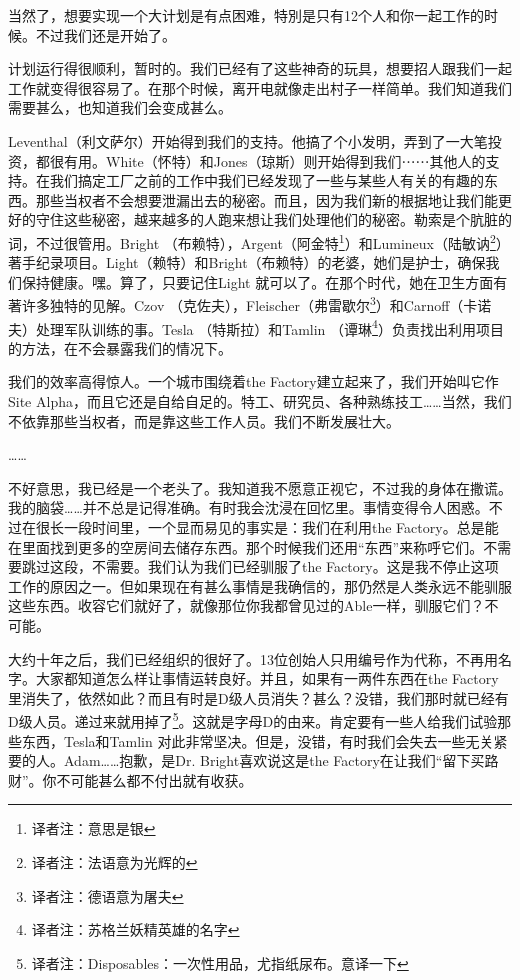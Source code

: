 \documentclass[openany,a4paper]{book} %
\begin{document}
当然了，想要实现一个大计划是有点困难，特別是只有12个人和你一起工作的时候。不过我们还是开始了。\vspace{12pt}

计划运行得很顺利，暂时的。我们已经有了这些神奇的玩具，想要招人跟我们一起工作就变得很容易了。在那个时候，离开电就像走出村子一样简单。我们知道我们需要甚么，也知道我们会变成甚么。\vspace{12pt}

Leventhal（利文萨尔）开始得到我们的支持。他搞了个小发明，弄到了一大笔投资，都很有用。White（怀特）和Jones（琼斯）则开始得到我们⋯⋯其他人的支持。在我们搞定工厂之前的工作中我们已经发现了一些与某些人有关的有趣的东西。那些当权者不会想要泄漏出去的秘密。而且，因为我们新的根据地让我们能更好的守住这些秘密，越来越多的人跑来想让我们处理他们的秘密。勒索是个肮脏的词，不过很管用。Bright （布赖特），Argent（阿金特\footnote{译者注：意思是银}）和Lumineux（陆敏讷\footnote{译者注：法语意为光辉的}）著手纪录项目。Light（赖特）和Bright（布赖特）的老婆，她们是护士，确保我们保持健康。嘿。算了，只要记住Light 就可以了。在那个时代，她在卫生方面有著许多独特的见解。Czov （克佐夫），Fleischer（弗雷歇尔\footnote{译者注：德语意为屠夫}）和Carnoff（卡诺夫）处理军队训练的事。Tesla （特斯拉）和Tamlin （谭琳\footnote{译者注：苏格兰妖精英雄的名字}）负责找出利用项目的方法，在不会暴露我们的情况下。\vspace{12pt}

我们的效率高得惊人。一个城市围绕着the Factory建立起来了，我们开始叫它作Site Alpha，而且它还是自给自足的。特工、研究员、各种熟练技工……当然，我们不依靠那些当权者，而是靠这些工作人员。我们不断发展壮大。\vspace{12pt}

……\vspace{12pt}

不好意思，我已经是一个老头了。我知道我不愿意正视它，不过我的身体在撒谎。我的脑袋……并不总是记得准确。有时我会沈浸在回忆里。事情变得令人困惑。不过在很长一段时间里，一个显而易见的事实是：我们在利用the Factory。总是能在里面找到更多的空房间去储存东西。那个时候我们还用“东西”来称呼它们。不需要跳过这段，不需要。我们认为我们已经驯服了the Factory。这是我不停止这项工作的原因之一。但如果现在有甚么事情是我确信的，那仍然是人类永远不能驯服这些东西。收容它们就好了，就像那位你我都曾见过的Able一样，驯服它们？不可能。\vspace{12pt}

大约十年之后，我们已经组织的很好了。13位创始人只用编号作为代称，不再用名字。大家都知道怎么样让事情运转良好。并且，如果有一两件东西在the Factory里消失了，依然如此？而且有时是D级人员消失？甚么？没错，我们那时就已经有D级人员。递过来就用掉了\footnote{译者注：Disposables：一次性用品，尤指纸尿布。意译一下}。这就是字母D的由来。肯定要有一些人给我们试验那些东西，Tesla和Tamlin 对此非常坚决。但是，没错，有时我们会失去一些无关紧要的人。Adam……抱歉，是Dr. Bright喜欢说这是the Factory在让我们“留下买路财”。你不可能甚么都不付出就有收获。\vspace{12pt}
\end{document}
